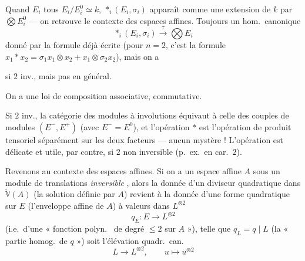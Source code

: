 \documentclass[11pt,a4paper]{article}
\begin{document}
Quand \struck{\ill{}}  $E_i$ tous $E_i/E_i^0 \simeq k$,  $\mathop{\ast}_i(E_i, \sigma_i)$ apparaît comme une extension de $k$ par $\bigotimes E_i^0$ --- on retrouve le contexte des espaces affines. Toujours un hom.\ canonique
\[
  \mathop{\ast}_i (E_i, \sigma_i) \xrightarrow{\ \tau\ } \bigotimes E_i
\]
donné par la formule déjà écrite (pour $n = 2$, c'est la formule $x_1 * x_2 = \sigma_1 x_1 \otimes x_2 + x_1 \otimes \sigma_2 x_2$), mais on a


si $2$ inv., mais pas en général.

On a une loi de composition  associative, commutative.


Si $2$ inv., la catégorie des modules à involutions équivaut à celle des \struck{\ill{}} couples de modules $(E^-, E^+)$ (avec $E^- = E^0$), et l'opération $*$ est l'opération de produit tensoriel séparément sur les deux facteurs \struck{\ill{}} --- aucun mystère ! L'opération est délicate et utile, par contre, si $2$ non inversible (p.\ ex.\ en car.\ $2$).

Revenons au contexte des espaces affines. Si on a un espace affine $A$ sous un module de translations \emph{inversible} , alors la donnée d'un diviseur quadratique dans $\check{\mathbb{V}}(A)$  (la solution \struck{\ill{}} définie par $A$) revient à la donnée d'une forme quadratique sur $E$ (l'enveloppe affine de $A$) à valeurs dans $L^{\otimes 2}$
\[
  q_E : E \longrightarrow L^{\otimes 2}
\]
(i.e.\ d'une « fonction polyn.\  de degré $\leq 2$ sur $A$ »), telle que $q_L = q \mid L$ (la « partie homog.\ de $q$ ») soit l'élévation \struck{\ill{}} quadr.\ can.
\[
  L \longrightarrow L^{\otimes 2}, \qquad u \longmapsto u^{\otimes 2}
\]
\end{document}
